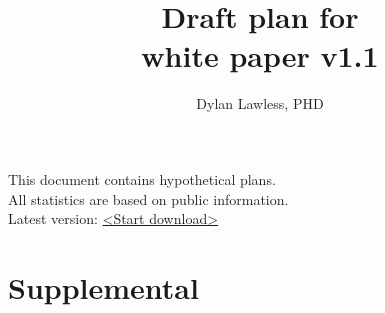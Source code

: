 \documentclass{article}
\newcommand{\whitepaperversion}{white paper v1.1}
\begin{document}
%


\title{\Large \bf Draft plan for \pmu\\
{\whitepaperversion}}
\author[1]{\rm Dylan Lawless, PHD}

\maketitle
\color{kispiblack}
This document contains hypothetical plans.\\
All statistics are based on public information.\\
Latest version: \href{https://downgit.github.io/#/home?url=https://github.com/DylanLawless/precision_med_group/blob/main/whitepaper_1/whitepaper_1.1.pdf}{<Start download>}
\tableofcontents
{} 
\clearpage


 \clearpage
 \clearpage















\clearpage

\clearpage






\beginsupplement
\section{Supplemental}
\label{sec:Supplemental_text}

\end{document}
